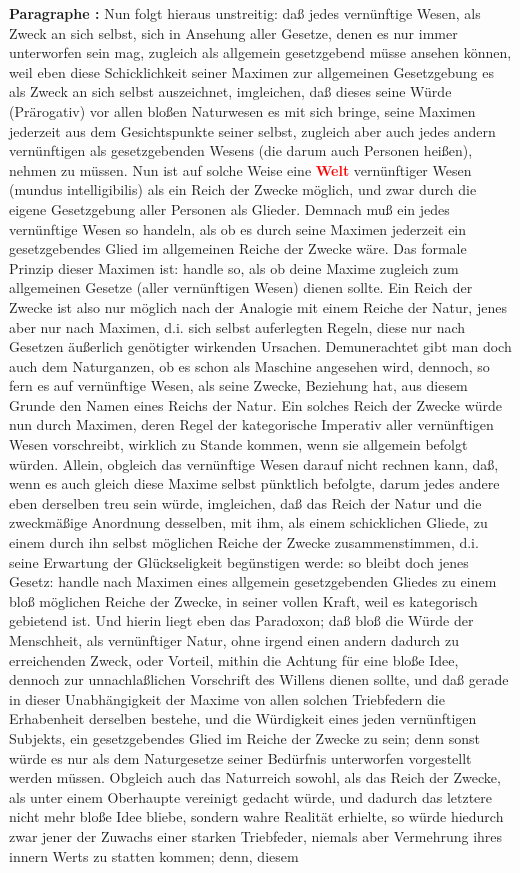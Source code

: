 \documentclass[a4paper,12pt,twoside]{book}
\newcommand{\match}[1]{\textcolor{red}{\textbf{#1}}}
\begin{document}
	\noindent\textbf{Paragraphe : }Nun folgt hieraus unstreitig: daß jedes vernünftige Wesen, als Zweck an sich selbst, sich in Ansehung aller Gesetze, denen es nur immer unterworfen sein mag, zugleich als allgemein gesetzgebend müsse ansehen können, weil eben diese Schicklichkeit seiner Maximen zur allgemeinen Gesetzgebung es als Zweck an sich selbst auszeichnet, imgleichen, daß dieses seine Würde (Prärogativ) vor allen bloßen Naturwesen es mit sich bringe, seine Maximen jederzeit aus dem Gesichtspunkte seiner selbst, zugleich aber auch jedes andern vernünftigen als gesetzgebenden Wesens (die darum auch Personen heißen), nehmen zu müssen. Nun ist auf solche Weise eine \match{Welt} vernünftiger Wesen (mundus intelligibilis) als ein Reich der Zwecke möglich, und zwar durch die eigene Gesetzgebung aller Personen als Glieder. Demnach muß ein jedes vernünftige Wesen so handeln, als ob es durch seine Maximen jederzeit ein gesetzgebendes Glied im allgemeinen Reiche der Zwecke wäre. Das formale Prinzip dieser Maximen ist: handle so, als ob deine Maxime zugleich zum allgemeinen Gesetze (aller vernünftigen Wesen) dienen sollte. Ein Reich der Zwecke ist also nur möglich nach der Analogie mit einem Reiche der Natur, jenes aber nur nach Maximen, d.i. sich selbst auferlegten Regeln, diese nur nach Gesetzen äußerlich genötigter wirkenden Ursachen. Demunerachtet gibt man doch auch dem Naturganzen, ob es schon als Maschine angesehen wird, dennoch, so fern es auf vernünftige Wesen, als seine Zwecke, Beziehung hat, aus diesem Grunde den Namen eines Reichs der Natur. Ein solches Reich der Zwecke würde nun durch Maximen, deren Regel der kategorische Imperativ aller vernünftigen Wesen vorschreibt, wirklich zu Stande kommen, wenn sie allgemein befolgt würden. Allein, obgleich das vernünftige Wesen darauf nicht rechnen kann, daß, wenn es auch gleich  diese Maxime selbst pünktlich befolgte, darum jedes andere eben derselben treu sein würde, imgleichen, daß das Reich der Natur und die zweckmäßige Anordnung desselben, mit ihm, als einem schicklichen Gliede, zu einem durch ihn selbst möglichen Reiche der Zwecke zusammenstimmen, d.i. seine Erwartung der Glückseligkeit begünstigen werde: so bleibt doch jenes Gesetz: handle nach Maximen eines allgemein gesetzgebenden Gliedes zu einem bloß möglichen Reiche der Zwecke, in seiner vollen Kraft, weil es kategorisch gebietend ist. Und hierin liegt eben das Paradoxon; daß bloß die Würde der Menschheit, als vernünftiger Natur, ohne irgend einen andern dadurch zu erreichenden Zweck, oder Vorteil, mithin die Achtung für eine bloße Idee, dennoch zur unnachlaßlichen Vorschrift des Willens dienen sollte, und daß gerade in dieser Unabhängigkeit der Maxime von allen solchen Triebfedern die Erhabenheit derselben bestehe, und die Würdigkeit eines jeden vernünftigen Subjekts, ein gesetzgebendes Glied im Reiche der Zwecke zu sein; denn sonst würde es nur als dem Naturgesetze seiner Bedürfnis unterworfen vorgestellt werden müssen. Obgleich auch das Naturreich sowohl, als das Reich der Zwecke, als unter einem Oberhaupte vereinigt gedacht würde, und dadurch das letztere nicht mehr bloße Idee bliebe, sondern wahre Realität erhielte, so würde hiedurch zwar jener der Zuwachs einer starken Triebfeder, niemals aber Vermehrung ihres innern Werts zu statten kommen; denn, diesem 
\end{document}
